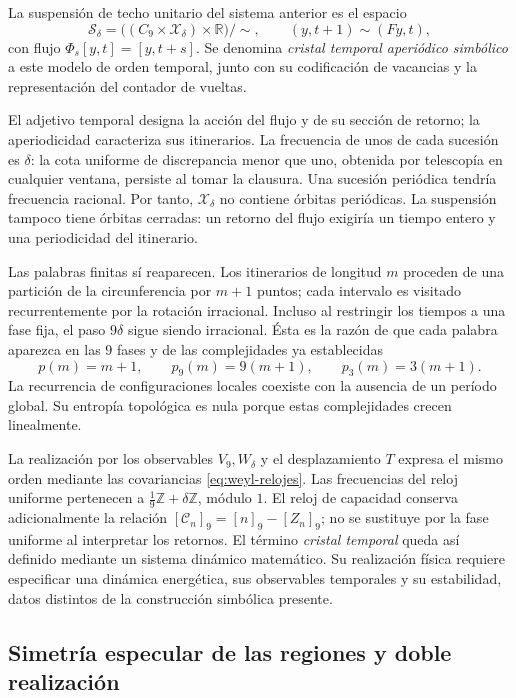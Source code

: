 \begin{definition}
\label{mono-ampl:def-cristal}
La suspensión de techo unitario del sistema anterior es el espacio
\[
 \mathcal S_\delta=
 \bigl((C_9\times\mathcal X_\delta)\times\mathbb R\bigr)/\sim,
 \qquad (y,t+1)\sim(Fy,t),
\]
con flujo \(\Phi_s[y,t]=[y,t+s]\). Se denomina \emph{cristal temporal
aperiódico simbólico} a este modelo de orden temporal, junto con su
codificación de vacancias y la representación del contador de vueltas.
\end{definition}

El adjetivo temporal designa la acción del flujo y de su sección de retorno;
la aperiodicidad caracteriza sus itinerarios. La frecuencia de unos de cada
sucesión es \(\delta\): la cota uniforme de discrepancia menor que uno,
obtenida por telescopía en cualquier ventana, persiste al tomar la clausura.
Una sucesión periódica tendría frecuencia racional. Por tanto,
\(\mathcal X_\delta\) no contiene órbitas periódicas. La suspensión
tampoco tiene órbitas cerradas: un retorno del flujo exigiría un tiempo
entero y una periodicidad del itinerario.

Las palabras finitas sí reaparecen. Los itinerarios de longitud \(m\)
proceden de una partición de la circunferencia por \(m+1\) puntos; cada
intervalo es visitado recurrentemente por la rotación irracional. Incluso
al restringir los tiempos a una fase fija, el paso \(9\delta\) sigue
siendo irracional. Ésta es la razón de que cada palabra aparezca en las
\(9\) fases y de las complejidades ya establecidas
\[
 p(m)=m+1,\qquad p_9(m)=9(m+1),\qquad p_3(m)=3(m+1).
\]
La recurrencia de configuraciones locales coexiste con la ausencia de un
período global. Su entropía topológica es nula porque estas complejidades
crecen linealmente.

La realización por los observables \(V_9,W_\delta\) y el desplazamiento
\(T\) expresa el mismo orden mediante las covariancias
\eqref{eq:weyl-relojes}. Las frecuencias del reloj uniforme pertenecen a
\(\frac19\mathbb Z+\delta\mathbb Z\), módulo \(1\). El reloj de
capacidad conserva adicionalmente la relación
\([\mathcal C_n]_9=[n]_9-[Z_n]_9\); no se sustituye por la fase uniforme
al interpretar los retornos. El término \emph{cristal temporal} queda así
definido mediante un sistema dinámico matemático. Su realización física
requiere especificar una dinámica energética, sus observables temporales
y su estabilidad, datos distintos de la construcción simbólica presente.

\subsection{Simetría especular de las regiones y doble realización}
\label{mono-ampl:regiones}

